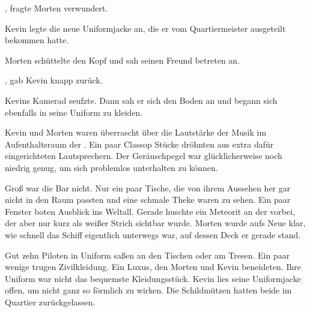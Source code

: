 \par

, fragte Morten verwundert.

\par

Kevin legte die neue Uniformjacke an, die er vom Quartiermeister ausgeteilt bekommen hatte. 

\par

Morten schüttelte den Kopf und sah seinen Freund betreten an. 

\par

, gab Kevin knapp zurück. 

\par

Kevins Kamerad seufzte. Dann sah er sich den Boden an und begann sich ebenfalls in seine Uniform zu kleiden.

\par

Kevin und Morten waren überrascht über die Lautstärke der Musik im Aufenthaltsraum der . Ein paar Classop Stücke dröhnten aus extra dafür eingerichteten Lautsprechern. Der Geräuschpegel war glücklicherweise noch niedrig genug, um sich problemlos unterhalten zu können.

\par

Groß war die Bar nicht. Nur ein paar Tische, die von ihrem Aussehen her gar nicht in den Raum passten und eine schmale Theke waren zu sehen. Ein paar Fenster boten Ausblick ins Weltall. Gerade huschte ein Meteorit an der  vorbei, der aber nur kurz als weißer Strich sichtbar wurde. Morten wurde aufs Neue klar, wie schnell das Schiff eigentlich unterwegs war, auf dessen Deck er gerade stand.

\par

Gut zehn Piloten in Uniform saßen an den Tischen oder am Tresen. Ein paar wenige trugen Zivilkleidung. Ein Luxus, den Morten und Kevin beneideten. Ihre Uniform war nicht das bequemste Kleidungsstück. Kevin lies seine Uniformjacke offen, um nicht ganz so förmlich zu wirken. Die Schildmützen hatten beide im Quartier zurückgelassen.

